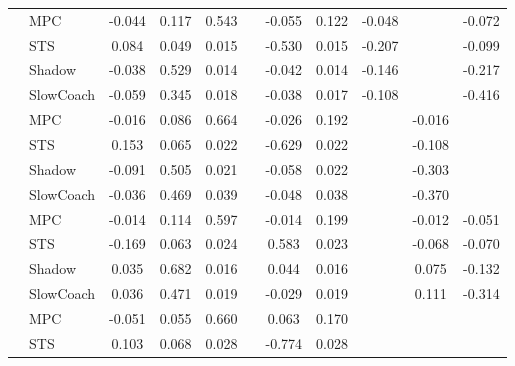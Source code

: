 \begin{tabular}{|l|l|*{9}{c|}}
\midrule
[True, True, True, False, True, True, True, False, True] & MPC &   -0.044 &     0.117 &     0.543 &     & -0.055 &  0.122 &  -0.048 &      &   -0.072 \\
                                                           & STS &    0.084 &     0.049 &     0.015 &     & -0.530 &  0.015 &  -0.207 &      &   -0.099 \\
                                                           & Shadow &   -0.038 &     0.529 &     0.014 &     & -0.042 &  0.014 &  -0.146 &      &   -0.217 \\
                                                           & SlowCoach &   -0.059 &     0.345 &     0.018 &     & -0.038 &  0.017 &  -0.108 &      &   -0.416 \\
\midrule
[True, True, True, False, True, True, False, True, False] & MPC &   -0.016 &     0.086 &     0.664 &     & -0.026 &  0.192 &      &  -0.016 &       \\
                                                           & STS &    0.153 &     0.065 &     0.022 &     & -0.629 &  0.022 &      &  -0.108 &       \\
                                                           & Shadow &   -0.091 &     0.505 &     0.021 &     & -0.058 &  0.022 &      &  -0.303 &       \\
                                                           & SlowCoach &   -0.036 &     0.469 &     0.039 &     & -0.048 &  0.038 &      &  -0.370 &       \\
\midrule
[True, True, True, False, True, True, False, True, True] & MPC &   -0.014 &     0.114 &     0.597 &     & -0.014 &  0.199 &      &  -0.012 &   -0.051 \\
                                                           & STS &   -0.169 &     0.063 &     0.024 &     &  0.583 &  0.023 &      &  -0.068 &   -0.070 \\
                                                           & Shadow &    0.035 &     0.682 &     0.016 &     &  0.044 &  0.016 &      &   0.075 &   -0.132 \\
                                                           & SlowCoach &    0.036 &     0.471 &     0.019 &     & -0.029 &  0.019 &      &   0.111 &   -0.314 \\
\midrule
[True, True, True, False, True, True, False, False, False] & MPC &   -0.051 &     0.055 &     0.660 &     &  0.063 &  0.170 &      &      &       \\
                                                           & STS &    0.103 &     0.068 &     0.028 &     & -0.774 &  0.028 &      &      &       \\

\end{tabular}

